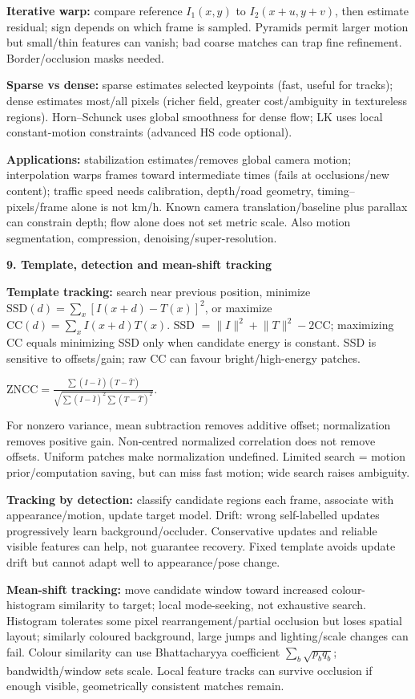 \documentclass[a4paper]{article}
\newcommand{\key}[1]{\textbf{#1}}
\newcommand{\Topic}[1]{\par\vspace{1.7pt}\noindent
  {\fontsize{7.7}{8.0}\selectfont\bfseries #1}\par\vspace{0.3pt}}
\newcommand{\eq}[1]{\par\noindent\mbox{\(\displaystyle #1\)}\par}
\newcommand{\norm}[1]{\lVert #1\rVert}
\newcounter{sheet}
\newcounter{sheetcolumn}
\newlength{\colwidth}
\newenvironment{sheetcol}[1][7.0]{\stepcounter{sheetcolumn}
  \begin{lrbox}{\columnbox}\begin{minipage}[t]{\colwidth}\vspace{0pt}
  \fontsize{#1}{\dimexpr#1pt+0.6pt\relax}\selectfont}
  {\end{minipage}\end{lrbox}
  \typeout{CV1COL|\thesheet|\thesheetcolumn|\the\dimexpr\ht\columnbox+\dp\columnbox\relax}
  \usebox{\columnbox}\ignorespacesafterend}
\begin{document}
\begin{sheetcol}
\key{Iterative warp:} compare reference \(I_1(x,y)\) to \(I_2(x+u,y+v)\), then estimate residual; sign depends on which frame is sampled. Pyramids permit larger motion but small/thin features can vanish; bad coarse matches can trap fine refinement. Border/occlusion masks needed.

\key{Sparse vs dense:} sparse estimates selected keypoints (fast, useful for tracks); dense estimates most/all pixels (richer field, greater cost/ambiguity in textureless regions). Horn--Schunck uses global smoothness for dense flow; LK uses local constant-motion constraints (advanced HS code optional).

\key{Applications:} stabilization estimates/removes global camera motion; interpolation warps frames toward intermediate times (fails at occlusions/new content); traffic speed needs calibration, depth/road geometry, timing--pixels/frame alone is not km/h. Known camera translation/baseline plus parallax can constrain depth; flow alone does not set metric scale. Also motion segmentation, compression, denoising/super-resolution.

\Topic{9. Template, detection and mean-shift tracking}
\key{Template tracking:} search near previous position, minimize \(\mathrm{SSD}(d)=\sum_x[I(x+d)-T(x)]^2\), or maximize \(\mathrm{CC}(d)=\sum_xI(x+d)T(x)\). SSD \(=\norm I^2+\norm T^2-2\mathrm{CC}\); maximizing CC equals minimizing SSD only when candidate energy is constant. SSD is sensitive to offsets/gain; raw CC can favour bright/high-energy patches.
\eq{\mathrm{ZNCC}=\frac{\sum(I-\bar I)(T-\bar T)}
 {\sqrt{\sum(I-\bar I)^2\sum(T-\bar T)^2}}.}
For nonzero variance, mean subtraction removes additive offset; normalization removes positive gain. Non-centred normalized correlation does not remove offsets. Uniform patches make normalization undefined. Limited search = motion prior/computation saving, but can miss fast motion; wide search raises ambiguity.

\key{Tracking by detection:} classify candidate regions each frame, associate with appearance/motion, update target model. Drift: wrong self-labelled updates progressively learn background/occluder. Conservative updates and reliable visible features can help, not guarantee recovery. Fixed template avoids update drift but cannot adapt well to appearance/pose change.

\key{Mean-shift tracking:} move candidate window toward increased colour-histogram similarity to target; local mode-seeking, not exhaustive search. Histogram tolerates some pixel rearrangement/partial occlusion but loses spatial layout; similarly coloured background, large jumps and lighting/scale changes can fail. Colour similarity can use Bhattacharyya coefficient \(\sum_b\sqrt{p_bq_b}\); bandwidth/window sets scale. Local feature tracks can survive occlusion if enough visible, geometrically consistent matches remain.


\end{sheetcol}
\end{document}
